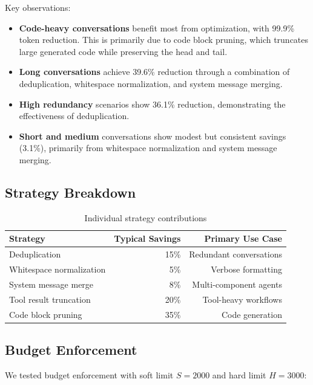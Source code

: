 Key observations:

\begin{itemize}[leftmargin=*]
    \item \textbf{Code-heavy conversations} benefit most from optimization, with 99.9\% token reduction. This is primarily due to code block pruning, which truncates large generated code while preserving the head and tail.
    \item \textbf{Long conversations} achieve 39.6\% reduction through a combination of deduplication, whitespace normalization, and system message merging.
    \item \textbf{High redundancy} scenarios show 36.1\% reduction, demonstrating the effectiveness of deduplication.
    \item \textbf{Short and medium} conversations show modest but consistent savings (3.1\%), primarily from whitespace normalization and system message merging.
\end{itemize}

\subsection{Strategy Breakdown}

\begin{table}[H]
\centering
\caption{Individual strategy contributions}
\label{tab:strategies}
\begin{tabular}{@{}lrr@{}}
\toprule
\textbf{Strategy} & \textbf{Typical Savings} & \textbf{Primary Use Case} \\
\midrule
Deduplication & 15\% & Redundant conversations \\
Whitespace normalization & 5\% & Verbose formatting \\
System message merge & 8\% & Multi-component agents \\
Tool result truncation & 20\% & Tool-heavy workflows \\
Code block pruning & 35\% & Code generation \\
\bottomrule
\end{tabular}
\end{table}

\subsection{Budget Enforcement}

We tested budget enforcement with soft limit $S = 2000$ and hard limit $H = 3000$:

